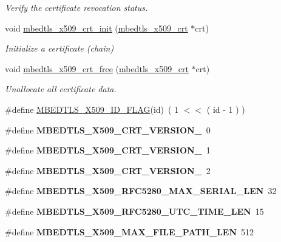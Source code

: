 \begin{DoxyCompactItemize}
\begin{DoxyCompactList}\small\item\em Verify the certificate revocation status. \end{DoxyCompactList}\item 
void \mbox{\hyperlink{group__x509__module_ga016dd06bc770e77b84005f305df20ed1}{mbedtls\+\_\+x509\+\_\+crt\+\_\+init}} (\mbox{\hyperlink{structmbedtls__x509__crt}{mbedtls\+\_\+x509\+\_\+crt}} $\ast$crt)
\begin{DoxyCompactList}\small\item\em Initialize a certificate (chain) \end{DoxyCompactList}\item 
void \mbox{\hyperlink{group__x509__module_gab33c1e4e20bea7ce536119f54a113c6b}{mbedtls\+\_\+x509\+\_\+crt\+\_\+free}} (\mbox{\hyperlink{structmbedtls__x509__crt}{mbedtls\+\_\+x509\+\_\+crt}} $\ast$crt)
\begin{DoxyCompactList}\small\item\em Unallocate all certificate data. \end{DoxyCompactList}\item 
\#define \mbox{\hyperlink{group__x509__module_gaedcb73f1c615c266a348a0c62763c5de}{M\+B\+E\+D\+T\+L\+S\+\_\+\+X509\+\_\+\+I\+D\+\_\+\+F\+L\+AG}}(id)~( 1 $<$$<$ ( id -\/ 1 ) )
\item 
\mbox{\label{group__x509__module_ga8d124765addc200627de55f2018b1ed3}} 
\#define {\bfseries M\+B\+E\+D\+T\+L\+S\+\_\+\+X509\+\_\+\+C\+R\+T\+\_\+\+V\+E\+R\+S\+I\+O\+N\+\_}~0
\item 
\mbox{\label{group__x509__module_ga46a0b7f3a4c1f279f609fd8ea304c192}} 
\#define {\bfseries M\+B\+E\+D\+T\+L\+S\+\_\+\+X509\+\_\+\+C\+R\+T\+\_\+\+V\+E\+R\+S\+I\+O\+N\+\_}~1
\item 
\mbox{\label{group__x509__module_ga7c22a610222ea94e1faf96223bc5d9a4}} 
\#define {\bfseries M\+B\+E\+D\+T\+L\+S\+\_\+\+X509\+\_\+\+C\+R\+T\+\_\+\+V\+E\+R\+S\+I\+O\+N\+\_}~2
\item 
\mbox{\label{group__x509__module_ga189113155d9c64d4b4255b16761377c7}} 
\#define {\bfseries M\+B\+E\+D\+T\+L\+S\+\_\+\+X509\+\_\+\+R\+F\+C5280\+\_\+\+M\+A\+X\+\_\+\+S\+E\+R\+I\+A\+L\+\_\+\+L\+EN}~32
\item 
\mbox{\label{group__x509__module_ga533580091501768fa25d4d682febbb08}} 
\#define {\bfseries M\+B\+E\+D\+T\+L\+S\+\_\+\+X509\+\_\+\+R\+F\+C5280\+\_\+\+U\+T\+C\+\_\+\+T\+I\+M\+E\+\_\+\+L\+EN}~15
\item 
\mbox{\label{group__x509__module_ga4ebc833300be4f784ac13ff0a38085ce}} 
\#define {\bfseries M\+B\+E\+D\+T\+L\+S\+\_\+\+X509\+\_\+\+M\+A\+X\+\_\+\+F\+I\+L\+E\+\_\+\+P\+A\+T\+H\+\_\+\+L\+EN}~512
\end{DoxyCompactItemize}
